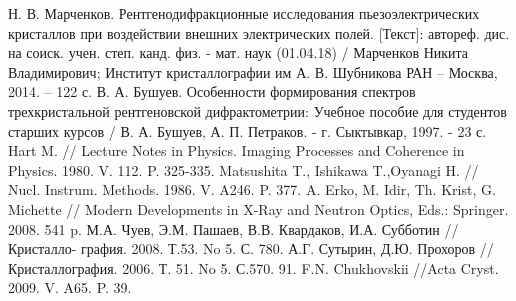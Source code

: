 \begin{thebibliography}{99}
    Н. В. Марченков. Рентгенодифракционные исследования пьезоэлектрических кристаллов
    при воздействии внешних электрических полей. [Текст]: автореф. дис. на соиск.
     учен. степ. канд. физ. - мат. наук (01.04.18) /
     Марченков Никита Владимирович; Институт кристаллографии им А. В. Шубникова РАН  – Москва, 2014. – 122 с.
     В. А. Бушуев. Особенности формирования спектров трехкристальной рентгеновской дифрактометрии:
    Учебное пособие для студентов старших курсов  / В. А. Бушуев, А. П. Петраков. - г. Сыктывкар, 1997. - 23 с.
      Hart M. // Lecture Notes in Physics. Imaging Processes and Coherence in Physics. 1980. V. 112. P. 325-335.
    Matsushita T., Ishikawa T.,Oyanagi H. // Nucl. Instrum. Methods. 1986. V. A246. P. 377.
      A. Erko, M. Idir, Th. Krist, G. Michette // Modern Developments in X-Ray and Neutron Optics, Eds.: Springer. 2008. 541 p.
    М.А. Чуев, Э.М. Пашаев, В.В. Квардаков, И.А. Субботин // Кристалло- графия. 2008. Т.53. No 5. С. 780.
    А.Г. Сутырин, Д.Ю. Прохоров //Кристаллография. 2006. Т. 51. No 5. С.570. 91. F.N. Chukhovskii //Acta Cryst. 2009. V. A65. P. 39.

\end{thebibliography}
